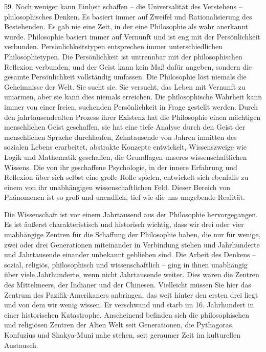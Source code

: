 \documentclass[11pt,a4paper]{book}
\begin{document}
59. Noch weniger kann Einheit schaffen -- die Universalität des Verstehens -- philosophisches Denken. Es basiert immer auf Zweifel und Rationalisierung des Bestehenden. Es gab nie eine Zeit, in der eine Philosophie als wahr anerkannt wurde. Philosophie basiert immer auf Vernunft und ist eng mit der Persönlichkeit verbunden. Persönlichkeitstypen entsprechen immer unterschiedlichen Philosophietypen. Die Persönlichkeit ist untrennbar mit der philosophischen Reflexion verbunden, und der Geist kann kein Maß dafür angeben, sondern die gesamte Persönlichkeit vollständig umfassen. Die Philosophie löst niemals die Geheimnisse der Welt. Sie sucht sie. Sie versucht, das Leben mit Vernunft zu umarmen, aber sie kann dies niemals erreichen. Die philosophische Wahrheit kann immer von einer freien, suchenden Persönlichkeit in Frage gestellt werden. Durch den jahrtausendealten Prozess ihrer Existenz hat die Philosophie einen mächtigen menschlichen Geist geschaffen, sie hat eine tiefe Analyse durch den Geist der menschlichen Sprache durchlaufen, Zehntausende von Jahren inmitten des sozialen Lebens erarbeitet, abstrakte Konzepte entwickelt, Wissenszweige wie Logik und Mathematik geschaffen, die Grundlagen unseres wissenschaftlichen Wissens. Die von ihr geschaffene Psychologie, in der innere Erfahrung und Reflexion über sich selbst eine große Rolle spielen, entwickelt sich ebenfalls zu einem von ihr unabhängigen wissenschaftlichen Feld. Dieser Bereich von Phänomenen ist so groß und unendlich, tief wie die uns umgebende Realität.



Die Wissenschaft ist vor einem Jahrtausend aus der Philosophie hervorgegangen. Es ist äußerst charakteristisch und historisch wichtig, dass wir drei oder vier unabhängige Zentren für die Schaffung der Philosophie haben, die nur für wenige, zwei oder drei Generationen miteinander in Verbindung stehen und Jahrhunderte und Jahrtausende einander unbekannt geblieben sind. Die Arbeit des Denkens -- sozial, religiös, philosophisch und wissenschaftlich -- ging in ihnen unabhängig über viele Jahrhunderte, wenn nicht Jahrtausende weiter. Dies waren die Zentren des Mittelmeers, der Indianer und der Chinesen. Vielleicht müssen Sie hier das Zentrum des Pazifik-Amerikaners anbringen, das weit hinter den ersten drei liegt und von dem wir wenig wissen. Er verschwand und starb im 16. Jahrhundert in einer historischen Katastrophe. Anscheinend befinden sich die philosophischen und religiösen Zentren der Alten Welt seit Generationen, die Pythagoras, Konfuzius und Shakya-Muni nahe stehen, seit geraumer Zeit im kulturellen Austausch.
\end{document}
